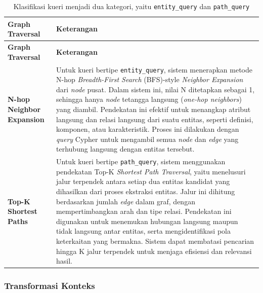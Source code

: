 \begin{longtable}{|p{}|p{}|}
	\caption{Klasifikasi kueri menjadi dua kategori, yaitu \texttt{entity\_query} dan \texttt{path\_query}}
	\label{tab:graph-traversal-strategy}                                                                                                                     \\
	\hline
	\textbf{Graph Traversal}          & \textbf{Keterangan}                                                                                                  \\
	\hline \hline
	\endfirsthead

	\hline
	\textbf{Graph Traversal}          & \textbf{Keterangan}                                                                                                  \\
	\hline \hline
	\endhead

	\textbf{N-hop Neighbor Expansion} &
	Untuk kueri bertipe \texttt{entity\_query}, sistem menerapkan metode N-hop \textit{Breadth-First Search} (BFS)-style \textit{Neighbor Expansion} dari \textit{node} pusat.
	Dalam sistem ini, nilai N ditetapkan sebagai 1, sehingga hanya \textit{node} tetangga langsung (\textit{one-hop neighbors}) yang diambil.
	Pendekatan ini efektif untuk menangkap atribut langsung dan relasi langsung dari suatu entitas, seperti definisi, komponen, atau karakteristik.
	Proses ini dilakukan dengan \textit{query} Cypher untuk mengambil semua \textit{node} dan \textit{edge} yang terhubung langsung dengan entitas tersebut. \\
	\hline
	\textbf{Top-K Shortest Paths}     &
	Untuk kueri bertipe \texttt{path\_query}, sistem menggunakan pendekatan Top-K \textit{Shortest Path Traversal}, yaitu menelusuri jalur terpendek antara setiap dua entitas kandidat yang dihasilkan dari proses ekstraksi entitas.
	Jalur ini dihitung berdasarkan jumlah \textit{edge} dalam graf, dengan mempertimbangkan arah dan tipe relasi.
	Pendekatan ini digunakan untuk menemukan hubungan langsung maupun tidak langsung antar entitas, serta mengidentifikasi pola keterkaitan yang bermakna.
	Sistem dapat membatasi pencarian hingga K jalur terpendek untuk menjaga efisiensi dan relevansi hasil.                                                   \\
	\hline
\end{longtable}


\subsubsection{Transformasi Konteks}


